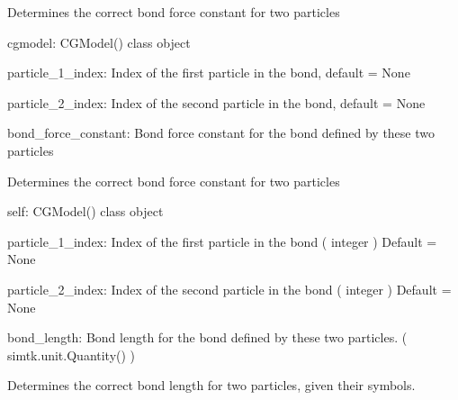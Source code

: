 \documentclass[letterpaper,12pt,english,openany,oneside]{sphinxmanual}
\begin{document}
\begin{fulllineitems}
\begin{fulllineitems}
\end{fulllineitems}


\begin{fulllineitems}
\label{\detokenize{cg_model:cg_model.cgmodel.CGModel.get_bond_force_constant}}
Determines the correct bond force constant for two particles

cgmodel: CGModel() class object

particle\_1\_index: Index of the first particle in the bond, default = None

particle\_2\_index: Index of the second particle in the bond, default = None

bond\_force\_constant: Bond force constant for the bond defined by these two particles

\end{fulllineitems}


\begin{fulllineitems}
\label{\detokenize{cg_model:cg_model.cgmodel.CGModel.get_bond_length}}
Determines the correct bond force constant for two particles

self: CGModel() class object

particle\_1\_index: Index of the first particle in the bond
( integer )
Default = None

particle\_2\_index: Index of the second particle in the bond
( integer )
Default = None

bond\_length: Bond length for the bond defined by these two particles.
( simtk.unit.Quantity() )

\end{fulllineitems}


\begin{fulllineitems}
\label{\detokenize{cg_model:cg_model.cgmodel.CGModel.get_bond_length_from_names}}
Determines the correct bond length for two particles, given their symbols.


\end{fulllineitems}
\end{fulllineitems}
\end{document}
